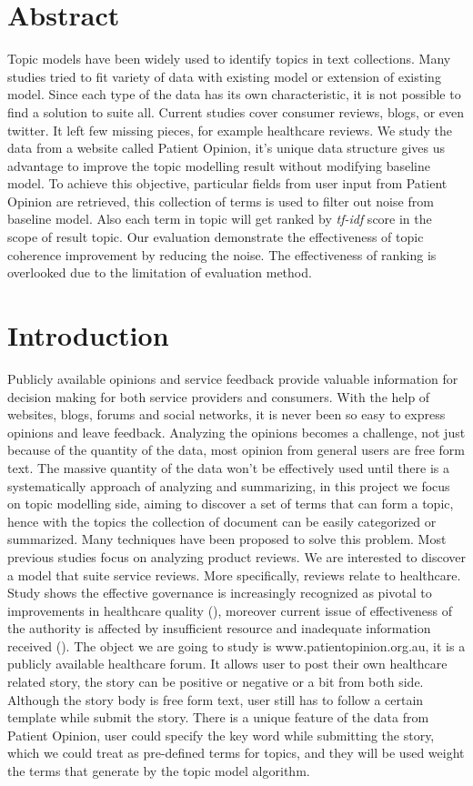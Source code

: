 \documentclass[11pt,twoside]{report}
\begin{document}
\chapter*{Abstract}
Topic models have been widely used to identify topics in text collections. Many studies tried to fit variety of data with existing model or extension of existing model. Since each type of the data has its own characteristic, it is not possible to find a solution to suite all. Current studies cover consumer reviews, blogs, or even twitter. It left few missing pieces, for example healthcare reviews. We study the data from a website called Patient Opinion, it's unique data structure gives us advantage to improve the topic modelling result without modifying baseline model. To achieve this objective, particular fields from user input from Patient Opinion are retrieved, this collection of terms is used to filter out noise from baseline model. Also each term in topic will get ranked by \textit{tf-idf} score in the scope of result topic. Our evaluation demonstrate the effectiveness of topic coherence improvement by reducing the noise. The effectiveness of ranking is overlooked due to the limitation of evaluation method.

\chapter{Introduction}
Publicly available opinions and service feedback provide valuable information for decision making for both service providers and consumers. With the help of websites, blogs, forums and social networks, it is never been so easy to express opinions and leave feedback. Analyzing the opinions becomes a challenge, not just because of the quantity of the data, most opinion from general users are free form text. The massive quantity of the data won’t be effectively used until there is a systematically approach of analyzing and summarizing, in this project we focus on topic modelling side, aiming to discover a set of terms that can form a topic, hence with the topics the collection of document can be easily categorized or summarized. Many techniques have been proposed to solve this problem. Most previous studies focus on analyzing product reviews. We are interested to discover a model that suite service reviews. More specifically, reviews relate to healthcare. Study shows the effective governance is increasingly recognized as pivotal to improvements in healthcare quality (\cite{ref6}), moreover current issue of effectiveness of the authority is affected by insufficient resource and inadequate information received (\cite{ref5}). The object we are going to study is www.patientopinion.org.au, it is a publicly available healthcare forum. It allows user to post their own healthcare related story,  the story can be positive or negative or a bit from both side. Although the story body is free form text, user still has to follow a certain template while submit the story. There is a unique feature of the data from Patient Opinion, user could specify the key word while submitting the story, which we could treat as pre-defined terms for topics, and they will be used weight the terms that generate by the topic model algorithm. 
\end{document}
